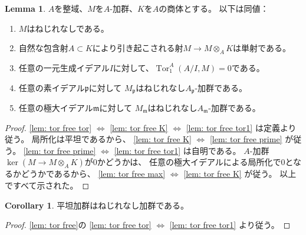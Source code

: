\documentclass[uplatex]{jsarticle}
\theoremstyle{definition}
\newtheorem{cor}[cor]{Corollary}
\newtheorem{lem}[lem]{Lemma}
\theoremstyle{plain}
\DeclareMathOperator{\Tor}{\mathrm{Tor}}
\begin{document}
\begin{lem}\label{lem: tor free}
  \(A\)を整域、\(M\)を\(A\)-加群、\(K\)を\(A\)の商体とする。
  以下は同値：
  \begin{enumerate}
    \item \label{lem: tor free tor}
    \(M\)はねじれなしである。
    \item \label{lem: tor free K}
    自然な包含射\(A\subset K\)により引き起こされる射\(M\to M\otimes_AK\)は単射である。
    \item \label{lem: tor free tor1}
    任意の一元生成イデアル\(I\)に対して、\(\Tor_1^A(A/I,M)=0\)である。
    \item \label{lem: tor free prime}
    任意の素イデアル\(\mathfrak{p}\)に対して
    \(M_{\mathfrak{p}}\)はねじれなし\(A_{\mathfrak{p}}\)-加群である。
    \item \label{lem: tor free max}
    任意の極大イデアル\(\mathfrak{m}\)に対して
    \(M_{\mathfrak{m}}\)はねじれなし\(A_{\mathfrak{m}}\)-加群である。
  \end{enumerate}
\end{lem}

\begin{proof}
  \ref{lem: tor free tor} \(\Leftrightarrow\) \ref{lem: tor free K}
  \(\Leftrightarrow\) \ref{lem: tor free tor1}
  は定義より従う。
  局所化は平坦であるから、
  \ref{lem: tor free K} \(\Leftrightarrow\) \ref{lem: tor free prime}
  が従う。
  \ref{lem: tor free prime} \(\Leftrightarrow\) \ref{lem: tor free tor1}
  は自明である。
  \(A\)-加群\(\ker(M\to M\otimes_AK)\)が\(0\)かどうかは、
  任意の極大イデアルによる局所化で\(0\)となるかどうかであるから、
  \ref{lem: tor free max} \(\Leftrightarrow\) \ref{lem: tor free K}
  が従う。
  以上ですべて示された。
\end{proof}

\begin{cor}
  平坦加群はねじれなし加群である。
\end{cor}

\begin{proof}
  \autoref{lem: tor free}の
  \ref{lem: tor free tor} \(\Leftrightarrow\) \ref{lem: tor free tor1}
  より従う。
\end{proof}
\end{document}
